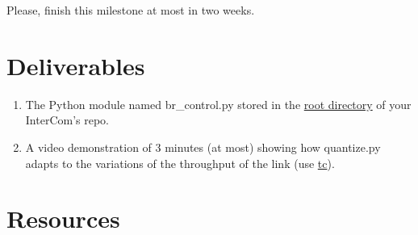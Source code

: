 Please, finish this milestone at most in two weeks.

\section{Deliverables}

\begin{enumerate}
  \item The Python module named br\_control.py stored in the
    \href{https://github.com/Tecnologias-multimedia/intercom}{root
      directory} of your InterCom's repo.  \item A video demonstration
    of 3 minutes (at most) showing how quantize.py adapts to the
    variations of the throughput of the link (use
    \href{https://man7.org/linux/man-pages/man8/tc.8.html}{tc}).
\end{enumerate}

\section{Resources}


